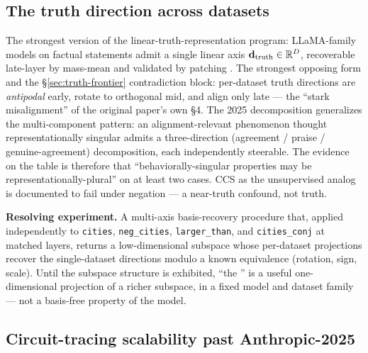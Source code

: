 \subsection{The truth direction across datasets}
\label{sec:contradictions-truth}

The strongest version of the linear-truth-representation program:
LLaMA-family models on factual statements admit a single linear axis
$\mathbf{d}_{\text{truth}} \in \mathbb{R}^D$, recoverable late-layer by
mass-mean and validated by patching
\citep[\S 3]{marks-tegmark-2023-truth}. The strongest opposing form
\citep[\S 4]{marks-tegmark-2023-truth} and the
\S\ref{sec:truth-frontier} contradiction block: per-dataset truth
directions are \emph{antipodal} early, rotate to orthogonal mid, and
align only late --- the ``stark misalignment'' of the original paper's
own §4. The 2025
\citet{vennemeyer2025-sycophancy-not-one-thing} 
decomposition generalizes the multi-component pattern: an
alignment-relevant phenomenon thought representationally singular
admits a three-direction (agreement / praise / genuine-agreement)
decomposition, each independently steerable. The evidence on the table
is therefore that ``behaviorally-singular properties may be
representationally-plural'' on at least two cases. CCS as the
unsupervised analog is documented to fail under negation
\citep[\S 1.1]{marks-tegmark-2023-truth} --- a near-truth confound, not
truth.

\textbf{Resolving experiment.} A multi-axis basis-recovery procedure
that, applied independently to \texttt{cities}, \texttt{neg\_cities},
\texttt{larger\_than}, and \texttt{cities\_conj} at matched layers,
returns a low-dimensional subspace whose per-dataset projections
recover the single-dataset directions modulo a known equivalence
(rotation, sign, scale). Until the subspace structure is exhibited,
``the '' is a useful one-dimensional projection of a
richer subspace, in a fixed model and dataset family --- not a
basis-free property of the model.

\subsection{Circuit-tracing scalability past Anthropic-2025}
\label{sec:contradictions-circuit-tracing}

